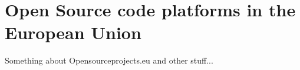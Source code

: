 \section{Open Source code platforms in the European Union}


Something about Opensourceprojects.eu and other stuff...